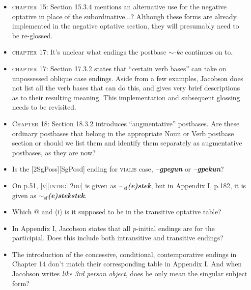 \documentclass{article}
\begin{document}
\begin{itemize}
\renewcommand\labelitemi{$\cdot$}

\item \textsc{chapter 15}: Section 15.3.4  mentions an alternative use for the negative optative in place of the subordinative...?
%
Although these forms are already implemented in the negative optative section, they will presumably need to be re-glossed.

\item \textsc{chapter 17}: It's unclear what endings the postbase \textit{$\sim$-ke} continues on to.

\item \textsc{chapter 17}: Section 17.3.2 states that ``certain verb bases'' can take on unpossessed oblique case endings.
%
Aside from a few examples, Jacobson does not list all the verb bases that can do this, and gives very brief descriptions as to their resulting meaning.
%
This implementation and subsequent glossing needs to be revisited.

\item \textsc{Chapter 18}: Section 18.3.2 introduces ``augmentative'' postbases.
%
Are these ordinary postbases that belong in the appropriate Noun or Verb postbase section or should we list them and identify them separately as augmentative postbases, as they are now?

\item Is the [2SgPoss][SgPosd] ending for \textsc{vialis} case, \textit{\textbf{--gpegun}} or \textit{\textbf{--gpekun}}?

\item On p.51, \textsc{[v][intrg][2du]} is given as \textit{\textbf{$\sim_\text{sf}$(e)stek}}, but in Appendix I, p.182, it is given as \textit{\textbf{$\sim_\text{sf}$(e)stekstek}}.

\item Which @ and (i) is it supposed to be in the transitive optative table?

\item In Appendix I, Jacobson states that all \textit{p}-initial endings are for the participial.
%
Does this include both intransitive and transitive endings?

\item The introduction of the concessive, conditional, contemporative endings in Chapter 14 don't match their corresponding table in Appendix I.
%
And when Jacobson writes \textit{like 3rd person object}, does he only mean the singular subject form?


\end{itemize}
\end{document}
